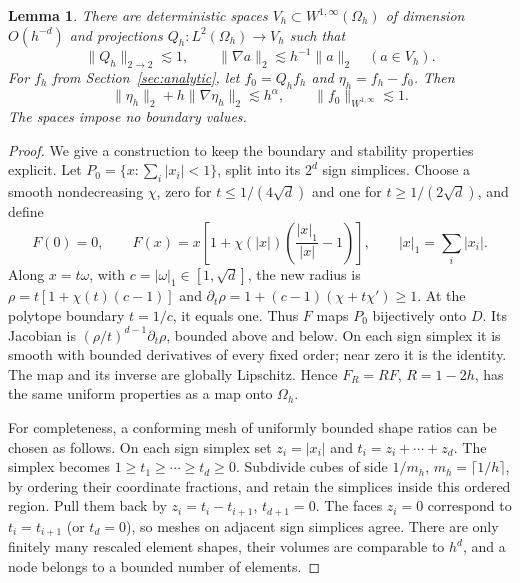 \documentclass[11pt]{article}
\newtheorem{lemma}[theorem]{Lemma}
\theoremstyle{remark}
\newcommand{\norm}[1]{\lVert #1\rVert}
\newcommand{\abs}[1]{\lvert #1\rvert}
\begin{document}
\begin{lemma}\label{lem:projection}
There are deterministic spaces $V_h\subset W^{1,\infty}(\Omega_h)$ of dimension $O(h^{-d})$ and projections $Q_h:L^2(\Omega_h)\to V_h$ such that
\begin{equation}\label{eq:projectionbounds}
 \norm{Q_h}_{2\to2}\lesssim1,\qquad
 \norm{\nabla a}_2\lesssim h^{-1}\norm a_2\quad(a\in V_h).
\end{equation}
For $f_h$ from Section~\ref{sec:analytic}, let $f_0=Q_hf_h$ and $\eta_h=f_h-f_0$. Then
\begin{equation}\label{eq:approx}
 \norm{\eta_h}_2+h\norm{\nabla\eta_h}_2\lesssim h^\alpha,
 \qquad \norm{f_0}_{W^{1,\infty}}\lesssim1.
\end{equation}
The spaces impose no boundary values.
\end{lemma}
\begin{proof}
We give a construction to keep the boundary and stability properties explicit. Let
$P_0=\{x:\sum_i\abs{x_i}<1\}$, split into its $2^d$ sign simplices. Choose a smooth nondecreasing $\chi$, zero for $t\le1/(4\sqrt d)$ and one for $t\ge1/(2\sqrt d)$, and define
\[
 F(0)=0,\qquad
 F(x)=x\left[1+\chi(\abs{x})\left(\frac{\abs{x}_1}{\abs{x}}-1\right)\right],
 \qquad \abs{x}_1=\sum_i\abs{x_i}.
\]
Along $x=t\omega$, with $c=\abs{\omega}_1\in[1,\sqrt d]$, the new radius is
$\rho=t[1+\chi(t)(c-1)]$ and
$\partial_t\rho=1+(c-1)(\chi+t\chi')\ge1$.
At the polytope boundary $t=1/c$, it equals one. Thus $F$ maps $P_0$ bijectively onto $D$. Its Jacobian is $(\rho/t)^{d-1}\partial_t\rho$, bounded above and below. On each sign simplex it is smooth with bounded derivatives of every fixed order; near zero it is the identity. The map and its inverse are globally Lipschitz. Hence $F_R=RF$, $R=1-2h$, has the same uniform properties as a map onto $\Omega_h$.

For completeness, a conforming mesh of uniformly bounded shape ratios can be chosen as follows. On each sign simplex set $z_i=\abs{x_i}$ and $t_i=z_i+\cdots+z_d$. The simplex becomes $1\ge t_1\ge\cdots\ge t_d\ge0$. Subdivide cubes of side $1/m_h$, $m_h=\lceil1/h\rceil$, by ordering their coordinate fractions, and retain the simplices inside this ordered region. Pull them back by $z_i=t_i-t_{i+1}$, $t_{d+1}=0$. The faces $z_i=0$ correspond to $t_i=t_{i+1}$ (or $t_d=0$), so meshes on adjacent sign simplices agree. There are only finitely many rescaled element shapes, their volumes are comparable to $h^d$, and a node belongs to a bounded number of elements.


\end{proof}
\end{document}
